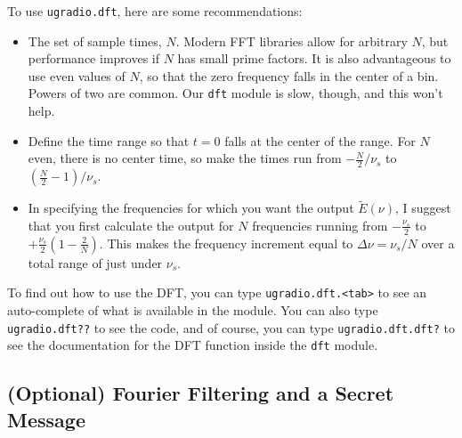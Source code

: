 \documentclass[11pt,preprint]{aastex}
\begin{document}
To use \verb$ugradio.dft$, here are some recommendations:
\begin{itemize}

\item The set of sample times, $N$. Modern FFT libraries allow for arbitrary $N$, but performance improves
if $N$ has small prime factors. 
It is also advantageous to use even values of $N$, so that the zero frequency falls in the center of a bin.
Powers of two are common. 
Our \verb$dft$ module is slow, though, and this won't help. 

\item Define the time range so that $t=0$ falls at the center of the range.
  For $N$ even, there is no center time, so make the times
  run from $-\frac{N}{2}/ \nu_s$ to $(\frac{N}{2} -1)/ \nu_s$.

\item 
  In specifying the frequencies for which you want the output $\tilde E(\nu)$, I 
  suggest that you first calculate the output for $N$
  frequencies running from $-\frac{\nu_s}{2}$ to $+\frac{\nu_s}{2}\left(1 - \frac{2}{N} \right)$. 
This makes the frequency
  increment equal to $\Delta \nu = \nu_s/N$ over a total range of
  just under $\nu_s$.

\end{itemize}

To find out how to use the DFT, you can type {\tt ugradio.dft.<tab>} to see an
auto-complete of what is available in the module.  You can also type {\tt ugradio.dft??} to see
the code, and of course, you can type {\tt ugradio.dft.dft?} to see the documentation for
the DFT function inside the {\tt dft} module.

\subsection{(Optional) Fourier Filtering and a Secret Message}
\end{document}
